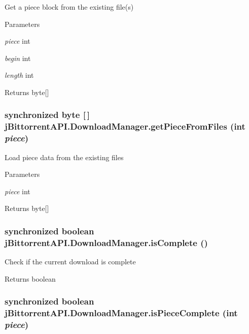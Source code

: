 \label{classj_bittorrent_a_p_i_1_1_download_manager_ad1e35cf49af550e1a2c47cf6c573a0ec}
Get a piece block from the existing file(s) 
\begin{DoxyParams}{Parameters}
\item[{\em piece}]int \item[{\em begin}]int \item[{\em length}]int \end{DoxyParams}
\begin{DoxyReturn}{Returns}
byte\mbox{[}\mbox{]} 
\end{DoxyReturn}
\hypertarget{classj_bittorrent_a_p_i_1_1_download_manager_aafe1b46b577a081aa52db87db81240f7}{
\subsubsection[{getPieceFromFiles}]{\setlength{\rightskip}{0pt plus 5cm}synchronized byte \mbox{[}$\,$\mbox{]} jBittorrentAPI.DownloadManager.getPieceFromFiles (int {\em piece})}}
\label{classj_bittorrent_a_p_i_1_1_download_manager_aafe1b46b577a081aa52db87db81240f7}
Load piece data from the existing files 
\begin{DoxyParams}{Parameters}
\item[{\em piece}]int \end{DoxyParams}
\begin{DoxyReturn}{Returns}
byte\mbox{[}\mbox{]} 
\end{DoxyReturn}
\hypertarget{classj_bittorrent_a_p_i_1_1_download_manager_a5fc8c9ae5c091bf5e4fd2ee8bbd47072}{
\subsubsection[{isComplete}]{\setlength{\rightskip}{0pt plus 5cm}synchronized boolean jBittorrentAPI.DownloadManager.isComplete ()}}
\label{classj_bittorrent_a_p_i_1_1_download_manager_a5fc8c9ae5c091bf5e4fd2ee8bbd47072}
Check if the current download is complete \begin{DoxyReturn}{Returns}
boolean 
\end{DoxyReturn}
\hypertarget{classj_bittorrent_a_p_i_1_1_download_manager_a4c5841b55bbd3b45e4fd89d049802579}{
\subsubsection[{isPieceComplete}]{\setlength{\rightskip}{0pt plus 5cm}synchronized boolean jBittorrentAPI.DownloadManager.isPieceComplete (int {\em piece})}}
